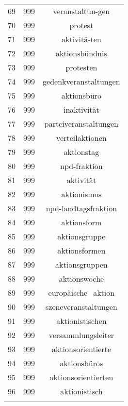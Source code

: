 \begin{table}[!htbp]
\begin{tabular}{@{\extracolsep{5pt}} ccc}
69 & 999 & veranstaltun-gen \\ 
70 & 999 & protest \\ 
71 & 999 & aktivitä-ten \\ 
72 & 999 & aktionsbündnis \\ 
73 & 999 & protesten \\ 
74 & 999 & gedenkveranstaltungen \\ 
75 & 999 & aktionsbüro \\ 
76 & 999 & inaktivität \\ 
77 & 999 & parteiveranstaltungen \\ 
78 & 999 & verteilaktionen \\ 
79 & 999 & aktionstag \\ 
80 & 999 & npd-fraktion \\ 
81 & 999 & aktivität \\ 
82 & 999 & aktionismus \\ 
83 & 999 & npd-landtagsfraktion \\ 
84 & 999 & aktionsform \\ 
85 & 999 & aktionsgruppe \\ 
86 & 999 & aktionsformen \\ 
87 & 999 & aktionsgruppen \\ 
88 & 999 & aktionswoche \\ 
89 & 999 & europäische\_aktion \\ 
90 & 999 & szeneveranstaltungen \\ 
91 & 999 & aktionistischen \\ 
92 & 999 & versammlungsleiter \\ 
93 & 999 & aktionsorientierte \\ 
94 & 999 & aktionsbüros \\ 
95 & 999 & aktionsorientierten \\ 
96 & 999 & aktionistisch \\ 
\hline \\[-1.8ex] 
\end{tabular} 
\end{table} 
